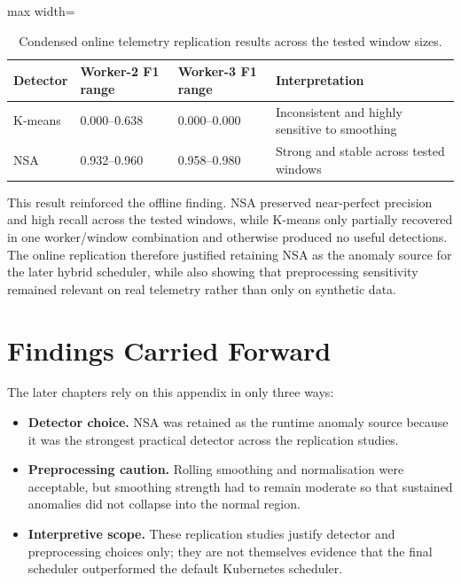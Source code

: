 \begin{appendices}
\begin{table}[h]
    \centering
    \begin{adjustbox}{max width=\textwidth}
    \begin{tabular}{llll}
        \hline
        \textbf{Detector} & \textbf{Worker-2 F1 range} & \textbf{Worker-3 F1 range} & \textbf{Interpretation} \\
        \hline
        K-means & 0.000--0.638 & 0.000--0.000 & Inconsistent and highly sensitive to smoothing \\
        NSA & 0.932--0.960 & 0.958--0.980 & Strong and stable across tested windows \\
        \hline
    \end{tabular}
    \end{adjustbox}
    \caption{Condensed online telemetry replication results across the tested window sizes.}
    \label{tab:appendix-online-replication}
\end{table}

This result reinforced the offline finding. NSA preserved near-perfect precision and high recall across the tested windows, while K-means only partially recovered in one worker/window combination and otherwise produced no useful detections. The online replication therefore justified retaining NSA as the anomaly source for the later hybrid scheduler, while also showing that preprocessing sensitivity remained relevant on real telemetry rather than only on synthetic data.

\section{Findings Carried Forward}

The later chapters rely on this appendix in only three ways:

\begin{itemize}
\item \textbf{Detector choice.} NSA was retained as the runtime anomaly source because it was the strongest practical detector across the replication studies.
\item \textbf{Preprocessing caution.} Rolling smoothing and normalisation were acceptable, but smoothing strength had to remain moderate so that sustained anomalies did not collapse into the normal region.
\item \textbf{Interpretive scope.} These replication studies justify detector and preprocessing choices only; they are not themselves evidence that the final scheduler outperformed the default Kubernetes scheduler.
\end{itemize}


\end{appendices}
